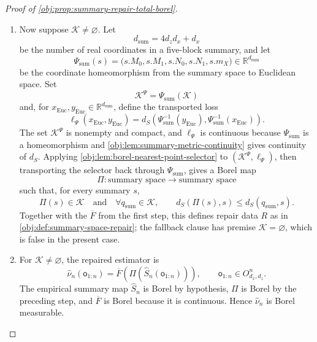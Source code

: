 \begin{proof}[Proof of \cref{obj:prop:summary-repair-total-borel}]
\begin{enumerate}
\item Now suppose \(\mathcal K\ne\varnothing\).  Let
\[
d_{\mathrm{sum}}=4d_zd_x+d_x
\]
be the number of real coordinates in a five-block summary, and let
\[
\Psi_{\mathrm{sum}}(s)
=\bigl(s.M_0,s.M_1,s.N_0,s.N_1,s.m_X\bigr)\in\mathbb R^{d_{\mathrm{sum}}}
\]
be the coordinate homeomorphism from the summary space to Euclidean space.  Set
\[
\mathcal K^\Psi=\Psi_{\mathrm{sum}}(\mathcal K)
\]
and, for \(x_{\mathrm{Euc}},y_{\mathrm{Euc}}\in\mathbb R^{d_{\mathrm{sum}}}\), define the transported loss
\[
\ell_\Psi(x_{\mathrm{Euc}},y_{\mathrm{Euc}})
=
d_S\!\left(\Psi_{\mathrm{sum}}^{-1}(y_{\mathrm{Euc}}),
           \Psi_{\mathrm{sum}}^{-1}(x_{\mathrm{Euc}})\right).
\]
The set \(\mathcal K^\Psi\) is nonempty and compact, and \(\ell_\Psi\) is continuous because \(\Psi_{\mathrm{sum}}\) is a homeomorphism and \cref{obj:lem:summary-metric-continuity} gives continuity of \(d_S\).  Applying \cref{obj:lem:borel-nearest-point-selector} to \((\mathcal K^\Psi,\ell_\Psi)\), then transporting the selector back through \(\Psi_{\mathrm{sum}}\), gives a Borel map
\[
\Pi:\text{summary space}\longrightarrow \text{summary space}
\]
such that, for every summary \(s\),
\[
\Pi(s)\in\mathcal K
\quad\text{and}\quad
\forall q_{\mathrm{sum}}\in\mathcal K,\qquad
d_S(\Pi(s),s)\le d_S(q_{\mathrm{sum}},s).
\]
Together with the \(\overline F\) from the first step, this defines repair data \(R\) as in \cref{obj:def:summary-space-repair}; the fallback clause has premise \(\mathcal K=\varnothing\), which is false in the present case. \hfill{}%

\item For \(\mathcal K\ne\varnothing\), the repaired estimator is
\[
\widehat\nu_n(\mathsf o_{1:n})
=
\overline F\!\left(\Pi(\widehat S_n(\mathsf o_{1:n}))\right),
\qquad
\mathsf o_{1:n}\in O_{d_x,d_z}^n.
\]
The empirical summary map \(\widehat S_n\) is Borel by hypothesis, \(\Pi\) is Borel by the preceding step, and \(\overline F\) is Borel because it is continuous.  Hence \(\widehat\nu_n\) is Borel measurable. \hfill{}%


\end{enumerate}
\end{proof}

